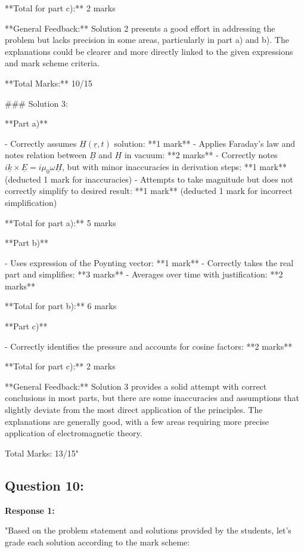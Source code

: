 \documentclass[a4paper,11pt]{article}
\begin{document}
**Total for part c):** 2 marks

**General Feedback:** Solution 2 presents a good effort in addressing the problem but lacks precision in some areas, particularly in part a) and b). The explanations could be clearer and more directly linked to the given expressions and mark scheme criteria.

**Total Marks:** 10/15

### Solution 3:

**Part a)**

- Correctly assumes \(\underline{H}(\underline{r}, t)\) solution: **1 mark**
- Applies Faraday's law and notes relation between \(\underline{B}\) and \(\underline{H}\) in vacuum: **2 marks**
- Correctly notes \(i \underline{k} \times \underline{E} = i \mu_0 \omega \underline{H}\), but with minor inaccuracies in derivation steps: **1 mark** (deducted 1 mark for inaccuracies)
- Attempts to take magnitude but does not correctly simplify to desired result: **1 mark** (deducted 1 mark for incorrect simplification)

**Total for part a):** 5 marks

**Part b)**

- Uses expression of the Poynting vector: **1 mark**
- Correctly takes the real part and simplifies: **3 marks**
- Averages over time with justification: **2 marks**

**Total for part b):** 6 marks

**Part c)**

- Correctly identifies the pressure and accounts for cosine factors: **2 marks**

**Total for part c):** 2 marks

**General Feedback:** Solution 3 provides a solid attempt with correct conclusions in most parts, but there are some inaccuracies and assumptions that slightly deviate from the most direct application of the principles. The explanations are generally good, with a few areas requiring more precise application of electromagnetic theory.

Total Marks: 13/15"

\subsection*{Question 10:}

\textbf{Response 1:}

"Based on the problem statement and solutions provided by the students, let's grade each solution according to the mark scheme:
\end{document}

